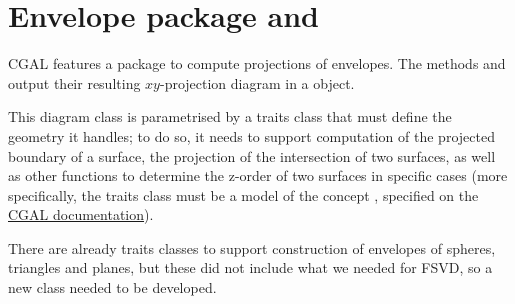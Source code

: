 \documentclass[11pt,a4paper,english]{article}
\begin{document}

	\section{Envelope package and }
	CGAL features a package to compute projections of envelopes. The methods  and  output their resulting \(xy\)-projection diagram in a  object.\par
	This diagram class is parametrised by a traits class that must define the geometry it handles; to do so, it needs to support computation of the projected boundary of a surface, the projection of the intersection of two surfaces, as well as other functions to determine the z-order of two surfaces in specific cases (more specifically, the traits class must be a model of the concept , specified on the \href{https://doc.cgal.org/4.9.1/Envelope_3/classEnvelopeTraits__3.html}{CGAL documentation}).\par
	There are already traits classes to support construction of envelopes of spheres, triangles and planes, but these did not include what we needed for FSVD, so a new class needed to be developed.
	
\end{document}
